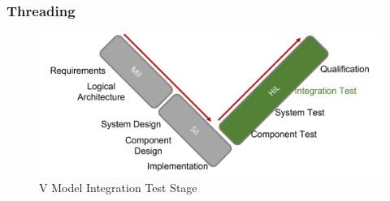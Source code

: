 \subsubsection{Threading}
\begin{figure}[h!]
    \begin{center}
    \includegraphics[width=12cm]{Pictures/V Model Integration Test.png}
    \caption[V Model Integration Test]{V Model Integration Test Stage}
    \label{V Model Integration Test}
    \end{center}
\end{figure}













